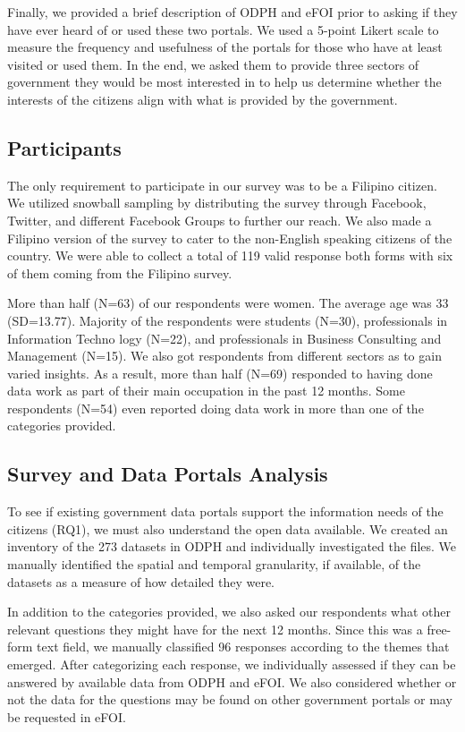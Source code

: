 \documentclass{sigchi}
\begin{document}
Finally, we provided a brief description of ODPH and eFOI prior to asking if they have ever heard of or used these two portals. We used a 5-point Likert scale to measure the frequency and usefulness of the portals for those who have at least visited or used them. In the end, we asked them to provide three sectors of government they would be most interested in to help us determine whether the interests of the citizens align with what is provided by the government.

\subsection{Participants}
The only requirement to participate in our survey was to be a Filipino citizen. We utilized snowball sampling by distributing the survey through Facebook, Twitter, and different Facebook Groups to further our reach. We also made a Filipino version of the survey to cater to the non-English speaking citizens of the country. We were able to collect a total of 119 valid response both forms with six of them coming from the Filipino survey.

More than half (N=63) of our respondents were women. The average age was 33 (SD=13.77). Majority of the respondents were students (N=30), professionals in Information Techno logy (N=22), and professionals in Business Consulting and Management (N=15). We also got respondents from different sectors as to gain varied insights. As a result, more than half (N=69) responded to having done data work as part of their main occupation in the past 12 months. Some respondents (N=54) even reported doing data work in more than one of the categories provided.

\subsection{Survey and Data Portals Analysis}
To see if existing government data portals support the information needs of the citizens (RQ1), we must also understand the open data available. We created an inventory of the 273 datasets in ODPH and individually investigated the files. We manually identified the spatial and temporal granularity, if available, of the datasets as a measure of how detailed they were.

In addition to the categories provided, we also asked our respondents what other relevant questions they might have for the next 12 months. Since this was a free-form text field, we manually classified 96 responses according to the themes that emerged. After categorizing each response, we individually assessed if they can be answered by available data from ODPH and eFOI. We also considered whether or not the data for the questions may be found on other government portals or may be requested in eFOI.
\end{document}
